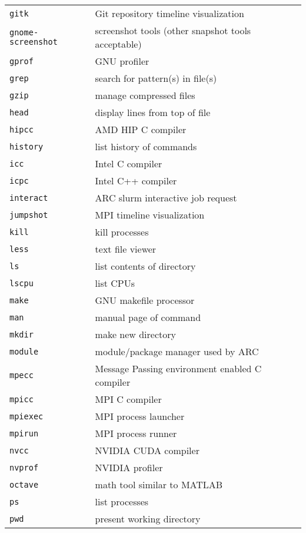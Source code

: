 \begin{table}
\begin{tabular}{@{\makebox[3em][r]{\rownumber\space}}|l|l}
        \texttt{gitk} & Git repository timeline visualization\\
        \texttt{gnome-screenshot} & screenshot tools (other snapshot tools acceptable) \\
        \texttt{gprof} & GNU profiler\\
        \texttt{grep} & search for pattern(s) in file(s) \\
        \texttt{gzip} & manage compressed files \\
        \texttt{head} & display lines from top of file\\
        \texttt{hipcc} & AMD HIP C compiler\\
        \texttt{history} & list history of commands \\
        \texttt{icc} & Intel C compiler\\
        \texttt{icpc} & Intel C++ compiler\\
        \texttt{interact} & ARC slurm interactive job request\\
        \texttt{jumpshot} & MPI timeline visualization  \\
         \texttt{kill} & kill processes\\
        \texttt{less} & text file viewer  \\
        \texttt{ls} & list contents of  directory  \\
        \texttt{lscpu} & list CPUs  \\
        \texttt{make} & GNU makefile processor \\
        \texttt{man} & manual page of command \\
        \texttt{mkdir} & make new directory \\
         \texttt{module} & module/package manager used by ARC \\
         \texttt{mpecc} & Message Passing environment enabled C compiler \\
        \texttt{mpicc} & MPI C compiler \\
        \texttt{mpiexec} & MPI process launcher \\
        \texttt{mpirun} & MPI process runner \\
        \texttt{nvcc} & NVIDIA CUDA compiler\\
        \texttt{nvprof} & NVIDIA profiler\\
        \texttt{octave} & math tool similar to MATLAB\\
        \texttt{ps} & list processes\\
        \texttt{pwd} & present working directory\\


\end{tabular}
\end{table}
